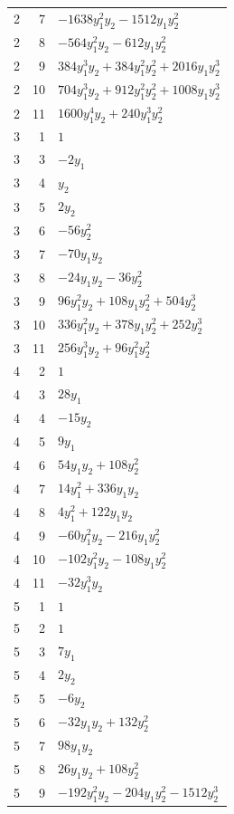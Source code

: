 \documentclass[10pt,a4paper]{article}
\begin{document}
{\begin{longtable}{rrp{125mm}}
2 & 7 & $- 1638 y_{1}^{2} y_{2} - 1512 y_{1} y_{2}^{2}$\\
2 & 8 & $- 564 y_{1}^{2} y_{2} - 612 y_{1} y_{2}^{2}$\\
2 & 9 & $384 y_{1}^{3} y_{2} + 384 y_{1}^{2} y_{2}^{2} + 2016 y_{1} y_{2}^{3}$\\
2 & 10 & $704 y_{1}^{3} y_{2} + 912 y_{1}^{2} y_{2}^{2} + 1008 y_{1} y_{2}^{3}$\\
2 & 11 & $1600 y_{1}^{4} y_{2} + 240 y_{1}^{3} y_{2}^{2}$\\
3 & 1 & $1$\\
3 & 3 & $- 2 y_{1}$\\
3 & 4 & $y_{2}$\\
3 & 5 & $2 y_{2}$\\
3 & 6 & $- 56 y_{2}^{2}$\\
3 & 7 & $- 70 y_{1} y_{2}$\\
3 & 8 & $- 24 y_{1} y_{2} - 36 y_{2}^{2}$\\
3 & 9 & $96 y_{1}^{2} y_{2} + 108 y_{1} y_{2}^{2} + 504 y_{2}^{3}$\\
3 & 10 & $336 y_{1}^{2} y_{2} + 378 y_{1} y_{2}^{2} + 252 y_{2}^{3}$\\
3 & 11 & $256 y_{1}^{3} y_{2} + 96 y_{1}^{2} y_{2}^{2}$\\
4 & 2 & $1$\\
4 & 3 & $28 y_{1}$\\
4 & 4 & $- 15 y_{2}$\\
4 & 5 & $9 y_{1}$\\
4 & 6 & $54 y_{1} y_{2} + 108 y_{2}^{2}$\\
4 & 7 & $14 y_{1}^{2} + 336 y_{1} y_{2}$\\
4 & 8 & $4 y_{1}^{2} + 122 y_{1} y_{2}$\\
4 & 9 & $- 60 y_{1}^{2} y_{2} - 216 y_{1} y_{2}^{2}$\\
4 & 10 & $- 102 y_{1}^{2} y_{2} - 108 y_{1} y_{2}^{2}$\\
4 & 11 & $- 32 y_{1}^{3} y_{2}$\\
5 & 1 & $1$\\
5 & 2 & $1$\\
5 & 3 & $7 y_{1}$\\
5 & 4 & $2 y_{2}$\\
5 & 5 & $- 6 y_{2}$\\
5 & 6 & $- 32 y_{1} y_{2} + 132 y_{2}^{2}$\\
5 & 7 & $98 y_{1} y_{2}$\\
5 & 8 & $26 y_{1} y_{2} + 108 y_{2}^{2}$\\
5 & 9 & $- 192 y_{1}^{2} y_{2} - 204 y_{1} y_{2}^{2} - 1512 y_{2}^{3}$\\

\end{longtable}}
\end{document}
